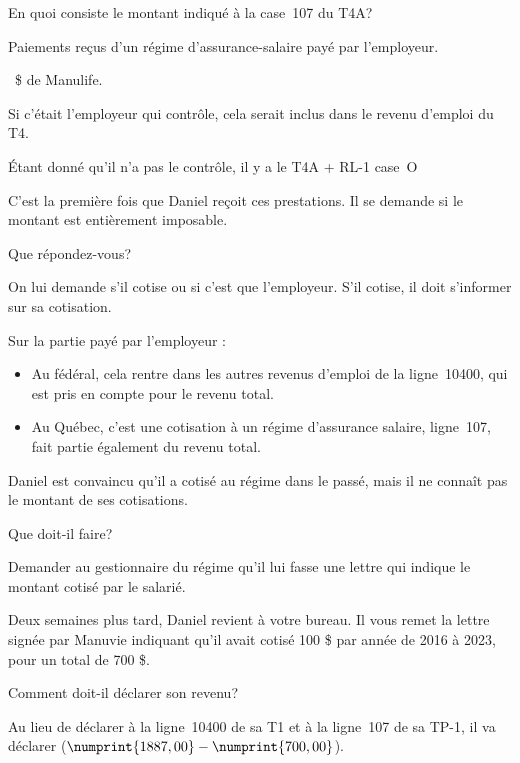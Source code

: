 \setcounter{question}{0}
\begin{question}
	En quoi consiste le montant indiqué à la case~107 du T4A?
\end{question}
Paiements reçus d'un régime d'assurance-salaire payé par l'employeur.

~\$ de Manulife.

Si c'était l'employeur qui contrôle, cela serait inclus dans le revenu d'emploi du T4.

Étant donné qu'il n'a pas le contrôle, il y a le T4A + RL-1 case~O

\begin{question}
	C'est la première fois que Daniel reçoit ces prestations. Il se demande si le montant est entièrement imposable. 
	
	Que répondez-vous?
\end{question}
On lui demande s'il cotise ou si c'est que l'employeur. S'il cotise, il doit s'informer sur sa cotisation.

Sur la partie payé par l'employeur :
\begin{itemize}
	\item Au fédéral, cela rentre dans les autres revenus d'emploi de la ligne~10400, qui est pris en compte pour le revenu total.
	\item Au Québec, c'est une cotisation à un régime d'assurance salaire, ligne~107, fait partie également du revenu total.
\end{itemize}

\begin{question}
	Daniel est convaincu qu'il a cotisé au régime dans le passé, mais il ne connaît pas le montant de ses cotisations. 
	
	Que doit-il faire?
\end{question}
Demander au gestionnaire du régime qu'il lui fasse une lettre qui indique le montant cotisé par le salarié.

\begin{question}
	Deux semaines plus tard, Daniel revient à votre bureau. Il vous remet la lettre signée par Manuvie indiquant qu'il avait cotisé 100 \$ par année de 2016 à 2023, pour un total de 700 \$.
	
	Comment doit-il déclarer son revenu?
\end{question}
Au lieu de déclarer  à la ligne~10400 de sa T1 et à la ligne~107 de sa TP-1, il va déclarer  ($\numprint{1887,00} - \numprint{700,00}$).


